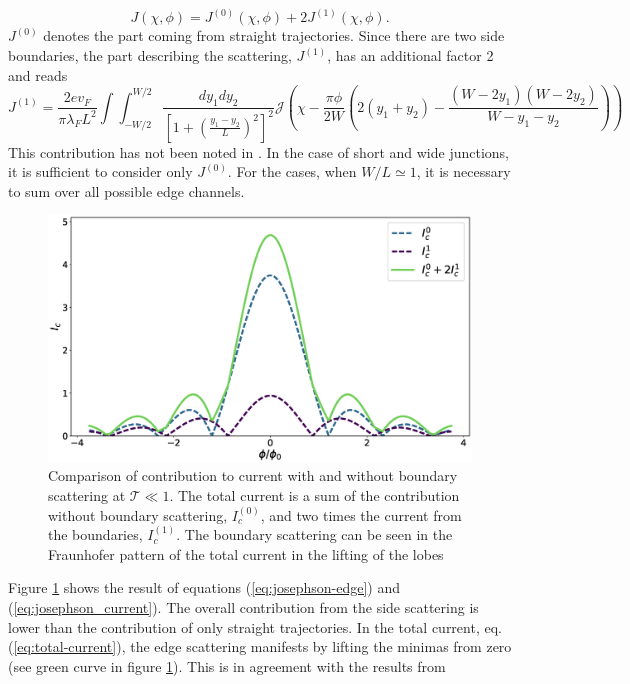 \begin{equation}
J \left( \chi, \phi \right) = J^{(0)} \left( \chi, \phi \right)  + 2 J^{(1)} \left( \chi, \phi \right).\label{eq:total-current}
\end{equation}
$J^{(0)}$ denotes the part coming from straight trajectories. Since there are two side boundaries, the part describing the scattering, $J^{(1)}$, has an additional factor 2 and reads
\begin{equation}
J^{(1)} = \frac{2 e v_F}{\pi \lambda_F L^2} \int \int_{-W/2}^{W/2} \frac{d y_1 d y_2}{ \left[ 1 + \left(\frac{y_1 - y_2}{L}\right)^2\right]^{2}} \mathcal{J} \left( \chi - \frac{\pi \phi}{2 W} \left( 2 (y_1 + y_2) - \frac{(W-2y_1)(W-2y_2)}{W - y_1 - y_2} \right)\right) \label{eq:josephson-edge}
\end{equation}
This contribution has not been noted in \cite{Meier2016}. In the case of short and wide junctions, it is sufficient to consider only $J^{(0)}$. For the cases, when $W / L \simeq 1$, it is necessary to sum over all possible edge channels.
\begin{figure}
\centering
\includegraphics[width=\textwidth]{figure/analyticalmodel/plane-setup-edge-contribution}
\caption{Comparison of contribution  to current with and without boundary scattering at $\mathcal{T} \ll 1$. The total current is a sum of the contribution without boundary scattering, $I_c^{(0)}$, and two times the current from the boundaries, $I_c^{(1)}$. The boundary scattering can be seen in the Fraunhofer pattern of the total current in the lifting of the lobes}\label{fig:plane-edge-contribution}
\end{figure}
Figure \ref{fig:plane-edge-contribution} shows the result of equations (\ref{eq:josephson-edge}) and (\ref{eq:josephson_current}). The overall contribution from the side scattering is lower than the contribution of only straight trajectories. In the total current, eq. (\ref{eq:total-current}), the edge scattering manifests by lifting the minimas from zero (see green curve in figure \ref{fig:plane-edge-contribution}). This is in agreement with the results from \cite{Meier2016}

